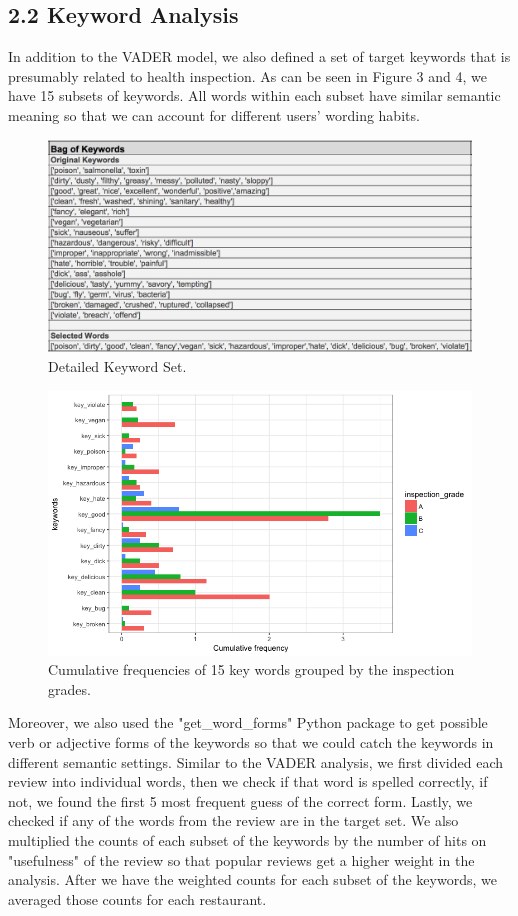 \documentclass[letterpaper, 11 pt, conference]{ieeeconf}
\begin{document}
\subsection*{2.2 Keyword Analysis}
In addition to the VADER model, we also defined a set of target keywords that is presumably related to health inspection. As can be seen in Figure 3 and 4, we have 15 subsets of keywords. All words within each subset have similar semantic meaning so that we can account for different users' wording habits. 

\begin{figure}[h]
	\centering
    \includegraphics[scale=0.35]{Bag_of_Keywords_pic}
    \caption{Detailed Keyword Set.}
\end{figure}

\begin{figure}[h]
	\centering
    \includegraphics[scale=0.25]{keywords}
    \caption{Cumulative frequencies of 15 key words grouped by the inspection grades.}
\end{figure}

Moreover, we also used the "get\_word\_forms" Python package to get possible verb or adjective forms of the keywords so that we could catch the keywords in different semantic settings. Similar to the VADER analysis, we first divided each review into individual words, then we check if that word is spelled correctly, if not, we found the first 5 most frequent guess of the correct form. Lastly, we checked if any of the words from the review are in the target set. We also multiplied the counts of each subset of the keywords by the number of hits on "usefulness" of the review so that popular reviews get a higher weight in the analysis. After we have the weighted counts for each subset of the keywords, we averaged those counts for each restaurant. 
\end{document}

